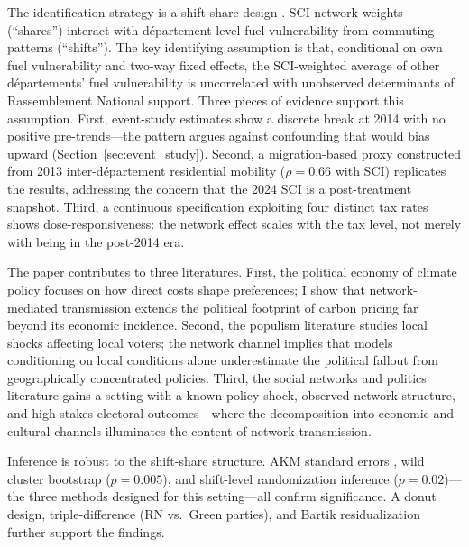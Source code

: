 \documentclass[12pt]{article}
\newcommand{\rn}{Rassemblement National}
\newcommand{\dept}{d\'{e}partement}
\newcommand{\depts}{d\'{e}partements}
\begin{document}
The identification strategy is a shift-share design \citep{goldsmith2020bartik, borusyak2022quasi}. SCI network weights (``shares'') interact with \dept{}-level fuel vulnerability from commuting patterns (``shifts''). The key identifying assumption is that, conditional on own fuel vulnerability and two-way fixed effects, the SCI-weighted average of other \depts{}' fuel vulnerability is uncorrelated with unobserved determinants of \rn{} support. Three pieces of evidence support this assumption. First, event-study estimates show a discrete break at 2014 with no positive pre-trends---the pattern argues against confounding that would bias upward (Section~\ref{sec:event_study}). Second, a migration-based proxy constructed from 2013 inter-\dept{} residential mobility ($\rho = 0.66$ with SCI) replicates the results, addressing the concern that the 2024 SCI is a post-treatment snapshot. Third, a continuous specification exploiting four distinct tax rates shows dose-responsiveness: the network effect scales with the tax level, not merely with being in the post-2014 era.

The paper contributes to three literatures. First, the political economy of climate policy \citep{douenne2022yellow, klenert2018carbon, stantcheva2022understanding} focuses on how direct costs shape preferences; I show that network-mediated transmission extends the political footprint of carbon pricing far beyond its economic incidence. Second, the populism literature \citep{autor2013china, rodrik2021populism, colantone2023global, funke2016going} studies local shocks affecting local voters; the network channel implies that models conditioning on local conditions alone underestimate the political fallout from geographically concentrated policies. Third, the social networks and politics literature \citep{bond2012experiment, enikolopov2020social, allcott2017social, fluckiger2025bro, chetty2022social1} gains a setting with a known policy shock, observed network structure, and high-stakes electoral outcomes---where the decomposition into economic and cultural channels illuminates the content of network transmission.

Inference is robust to the shift-share structure. AKM standard errors \citep{adao2019shift}, wild cluster bootstrap ($p = 0.005$), and shift-level randomization inference ($p = 0.02$)---the three methods designed for this setting---all confirm significance. A donut design, triple-difference (RN vs.\ Green parties), and Bartik residualization further support the findings.
\end{document}
